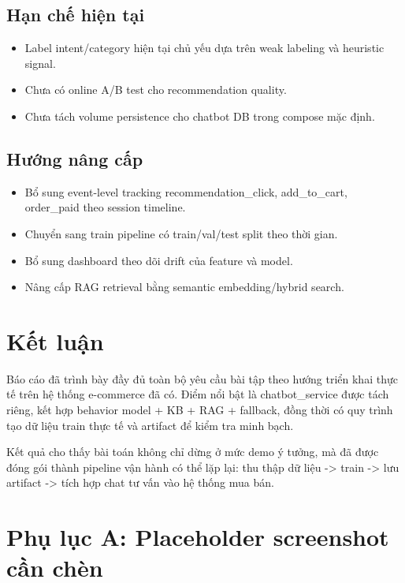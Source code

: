\documentclass[12pt,a4paper]{article}
\begin{document}
\subsection{Hạn chế hiện tại}
\begin{itemize}
  \item Label intent/category hiện tại chủ yếu dựa trên weak labeling và heuristic signal.
  \item Chưa có online A/B test cho recommendation quality.
  \item Chưa tách volume persistence cho chatbot DB trong compose mặc định.
\end{itemize}

\subsection{Hướng nâng cấp}
\begin{itemize}
  \item Bổ sung event-level tracking recommendation\_click, add\_to\_cart, order\_paid theo session timeline.
  \item Chuyển sang train pipeline có train/val/test split theo thời gian.
  \item Bổ sung dashboard theo dõi drift của feature và model.
  \item Nâng cấp RAG retrieval bằng semantic embedding/hybrid search.
\end{itemize}

\section{Kết luận}
Báo cáo đã trình bày đầy đủ toàn bộ yêu cầu bài tập theo hướng triển khai thực tế trên hệ thống e-commerce đã có. Điểm nổi bật là chatbot\_service được tách riêng, kết hợp behavior model + KB + RAG + fallback, đồng thời có quy trình tạo dữ liệu train thực tế và artifact để kiểm tra minh bạch.

Kết quả cho thấy bài toán không chỉ dừng ở mức demo ý tưởng, mà đã được đóng gói thành pipeline vận hành có thể lặp lại: thu thập dữ liệu -> train -> lưu artifact -> tích hợp chat tư vấn vào hệ thống mua bán.

\newpage
\section*{Phụ lục A: Placeholder screenshot cần chèn}
\end{document}
